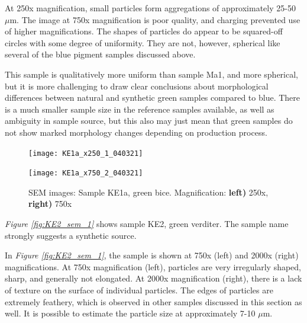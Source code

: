 At 250x magnification, small particles form aggregations of approximately 25-50 $\mu$m. The image at 750x magnification is poor quality, and charging prevented use of higher magnifications. The shapes of particles do appear to be squared-off circles with some degree of uniformity. They are not, however, spherical like several of the blue pigment samples discussed above. 

This sample is qualitatively more uniform than sample Ma1, and more spherical, but it is more challenging to draw clear conclusions about morphological differences between natural and synthetic green samples compared to blue. There is a much smaller sample size in the reference samples available, as well as ambiguity in sample source, but this also may just mean that green samples do not show marked morphology changes depending on production process.

\begin{figure}[H]
\centering
\begin{minipage}{.45\textwidth}
  \centering
  \texttt{[image: KE1a\_x250\_1\_040321]}
\end{minipage}
\begin{minipage}{.45\textwidth}
  \centering
  \texttt{[image: KE1a\_x750\_2\_040321]}
\end{minipage}
\caption[SEM images: Sample KE1a, green bice]{SEM images: Sample KE1a, green bice. Magnification: \textbf{left)} 250x, \textbf{right)} 750x}
\label{fig:KE1a_sem_1}
\end{figure}




\textit{Figure \ref{fig:KE2_sem_1}} shows sample KE2, green verditer. The sample name strongly suggests a synthetic source. 

In \textit{Figure \ref{fig:KE2_sem_1}}, the sample is shown at 750x (left) and 2000x (right) magnifications. At 750x magnification (left), particles are very irregularly shaped, sharp, and generally not elongated. At 2000x magnification (right), there is a lack of texture on the surface of individual particles. The edges of particles are extremely feathery, which is observed in other samples discussed in this section as well. It is possible to estimate the particle size at approximately 7-10 $\mu$m. 

